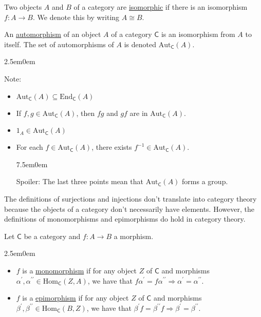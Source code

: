 \documentclass{book}
\newcommand{\hTwo}{%
   \color{MidnightBlue}%
   \fontsize{13}{15}\selectfont%
}
\newcommand{\hFour}{%
   \color{Cerulean}
   \fontsize{12}{14}\selectfont%
}
\newenvironment{myIndent}{%
   \begin{adjustwidth}{2.5em}{0em}%
}{%
   \end{adjustwidth}%
}
\newenvironment{myTindent}{%
   \begin{adjustwidth}{7.5em}{0em}%
}{%
   \end{adjustwidth}%
}
\newcommand{\udefine}[1]{{%
   \setulcolor{Red}%
   \setul{0.14em}{0.07em}%
   \ul{#1}%
}}
\newcommand{\pprime}{{\prime\prime}}
\newcommand{\myHom}{\mathrm{Hom}}
\newcommand{\myEnd}{\mathrm{End}}
\newcommand{\myAut}{\mathrm{Aut}}
\newcommand{\mcateg}[1]{\mathsf{#1}}
\newcommand{\retTwo}{\hfill\bigbreak}
\begin{document}
Two objects $A$ and $B$ of a category are \udefine{isomorphic} if there is an isomorphism\\ $f: A \longrightarrow B$. We denote this by writing $A \cong B$.\retTwo

An \udefine{automorphism} of an object $A$ of a category $\mcateg{C}$ is an isomorphism from $A$ to itself. The set of automorphisms of $A$ is denoted $\myAut_\mcateg{C}(A)$.
\begin{myIndent}
   \hTwo
   Note:
   \begin{itemize}
      \item $\myAut_\mcateg{C}(A) \subseteq \myEnd_\mcateg{C}(A)$
      \item If $f, g \in \myAut_\mcateg{C}(A)$, then $fg$ and $gf$ are in $\myAut_\mcateg{C}(A)$.
      \item $1_A \in \myAut_\mcateg{C}(A)$
      \item For each $f \in \myAut_\mcateg{C}(A)$, there exists $f^{-1} \in \myAut_\mcateg{C}(A)$.
      
      {\begin{myTindent}\hFour
         Spoiler: The last three points mean that $\myAut_\mcateg{C}(A)$ forms a group.\retTwo
      \end{myTindent}}
   \end{itemize}
\end{myIndent}

The definitions of surjections and injections don't translate into category theory\\ because the objects of a category don't necessarily have elements. However, the\\ definitions of monomorphisms and epimorphisms do hold in category theory.\retTwo

Let $\mcateg{C}$ be a category and $f: A \rightarrow B$ a morphism.
\begin{myIndent}
   \begin{itemize}
      \item $f$ is a \udefine{monomorphism} if for any object $Z$ of $\mcateg{C}$ and morphisms\\ $\alpha^\prime, \alpha^\pprime \in \myHom_\mcateg{C}(Z, A)$, we have that $f\alpha^\prime = f\alpha^\pprime \Longrightarrow \alpha^\prime = \alpha^\pprime$.\retTwo
      
      \item $f$ is a \udefine{epimorphism} if for any object $Z$ of $\mcateg{C}$ and morphisms\\ $\beta^\prime, \beta^\pprime \in \myHom_\mcateg{C}(B, Z)$, we have that $\beta^\prime f = \beta^\pprime f \Longrightarrow \beta^\prime = \beta^\pprime$.\retTwo
   \end{itemize}
\end{myIndent}
\end{document}
